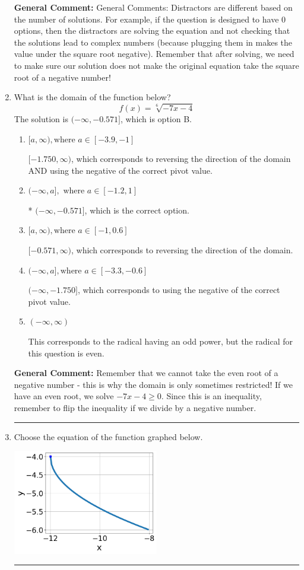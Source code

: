 \documentclass{extbook}[14pt]
\newcommand{\litem}[1]{\item #1

\rule{\textwidth}{0.4pt}}
\begin{document}
\begin{enumerate}
{\textbf{General Comment:} General Comments: Distractors are different based on the number of solutions. For example, if the question is designed to have 0 options, then the distractors are solving the equation and not checking that the solutions lead to complex numbers (because plugging them in makes the value under the square root negative). Remember that after solving, we need to make sure our solution does not make the original equation take the square root of a negative number!
}
\litem{
What is the domain of the function below?
\[ f(x) = \sqrt[6]{-7 x - 4} \]The solution is \( (-\infty, -0.571] \), which is option B.\begin{enumerate}[label=\Alph*.]
\item \( [a, \infty), \text{where } a \in [-3.9, -1] \)

$[-1.750, \infty)$, which corresponds to reversing the direction of the domain AND using the negative of the correct pivot value.
\item \( (-\infty, a], \text{ where } a \in [-1.2, 1] \)

* $(-\infty, -0.571]$, which is the correct option.
\item \( [a, \infty), \text{where } a \in [-1, 0.6] \)

 $[-0.571, \infty)$, which corresponds to reversing the direction of the domain.
\item \( (-\infty, a], \text{where } a \in [-3.3, -0.6] \)

$(-\infty, -1.750]$, which corresponds to using the negative of the correct pivot value.
\item \( (-\infty, \infty) \)

This corresponds to the radical having an odd power, but the radical for this question is even.
\end{enumerate}

\textbf{General Comment:} Remember that we cannot take the even root of a negative number - this is why the domain is only sometimes restricted! If we have an even root, we solve $-7 x - 4 \geq 0$. Since this is an inequality, remember to flip the inequality if we divide by a negative number.
}
\litem{
Choose the equation of the function graphed below.

\begin{center}
    \includegraphics[width=0.5\textwidth]{../Figures/radicalGraphToEquationB.png}
\end{center}


}
\end{enumerate}
\end{document}
